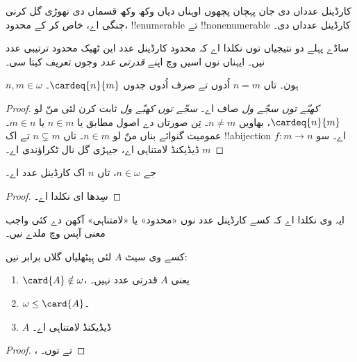 \documentclass[../../../include/open-logic-section]{subfiles}
\begin{document}

کارڈینل عدداں دی جان پہچان پچھوں اوہناں دیاں وکھ وکھ قسماں دی تھوڑی گل کرنی چنگی اے، خاص کر کے محدود، !!{enumerable} تے !!{nonenumerable} کارڈینل عدداں دی۔

ساڈے پہلے دو نتیجیاں توں نکلدا اے کہ محدود کارڈینل عدد این ٹھیک محدود ترتیبی عدد نیں۔ ایہناں نوں اسیں  وچ اپنے \emph{قدرتی عدد} وجوں تعریف کیتا سی۔

\begin{prop}
$n, m \in \omega$ ہون۔ تاں $n = m$ اُدوں تے صرف اُدوں جدوں $\cardeq{n}{m}$۔
\end{prop}

\begin{proof}
\emph{کھبّے توں سجّے ول} صاف اے۔ \emph{سجّے توں کھبّے ول} ثابت کرن لئی منّ لو $\cardeq{n}{m}$، بھاویں $n \neq m$۔ تِن صورتاں دے اصول مطابق یا $n
\in m$ یا $m \in n$۔ عمومیت گنوائے بناں منّ لو $n \in m$۔ تاں $n \subsetneq m$ تے اک !!a{bijection} $f \colon m \to n$ اے۔ سو $m$ ڈیڈیکنڈ لامتناہی اے، جیہڑی گل  نال ٹکراؤندی اے۔
\end{proof}

\begin{cor}
جے $n \in \omega$، تاں $n$ اک کارڈینل عدد اے۔
\end{cor}

\begin{proof}
سِدھا ای نکلدا اے۔
\end{proof}
\noindent
ایہ وی نکلدا اے کہ کسے کارڈینل عدد نوں «محدود» یا «لامتناہی» آکھن دے کئی واجب معنی آپس وچ ملدے نیں۔
\begin{thm}کسے وی سیٹ $A$ لئی ہِیٹھلیاں گلاں برابر نیں:
\begin{enumerate}
	\item{} $\card{A} \notin \omega$، یعنی
	$A$ قدرتی عدد نہیں۔
	\item{} $\omega \leq \card{A}$۔
	\item{} $A$ ڈیڈیکنڈ لامتناہی اے۔
\end{enumerate}
\end{thm}

\begin{proof}
،
 تے
 توں۔
\end{proof}
\end{document}
